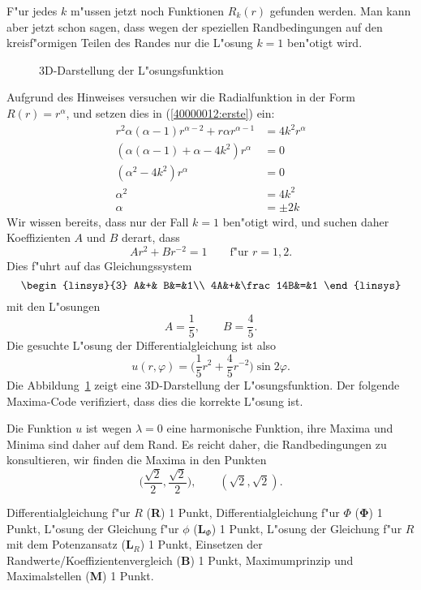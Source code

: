 \begin{loesung}
\begin{teilaufgaben}
F"ur jedes $k$ m"ussen jetzt noch Funktionen $R_k(r)$ gefunden werden.
Man kann aber jetzt schon sagen, dass wegen der speziellen Randbedingungen
auf den kreisf"ormigen Teilen des Randes nur die L"osung $k=1$ ben"otigt wird.

\begin{figure}
\centering
{}
\caption{3D-Darstellung der L"osungsfunktion
\label{40000012:3d}}
\end{figure}
Aufgrund des Hinweises versuchen wir die Radialfunktion in der Form
$R(r)=r^\alpha$, und setzen dies in (\ref{40000012:erste}) ein:
\begin{align*}
r^2\alpha(\alpha-1)r^{\alpha-2}+r\alpha r^{\alpha-1}&=4k^2r^{\alpha}
\\
(\alpha(\alpha-1)+\alpha -4k^2)r^{\alpha}&=0
\\
(\alpha^2 -4k^2)r^{\alpha}&=0
\\
\alpha^2&=4k^2
\\
\alpha&=\pm2k
\end{align*}
Wir wissen bereits, dass nur der Fall $k=1$ ben"otigt wird, und suchen
daher Koeffizienten $A$ und $B$ derart, dass
\[
Ar^2+Br^{-2}=1\qquad \text{f"ur $r=1,2$.}
\]
Dies f"uhrt auf das Gleichungssystem
\[
\begin{linsys}{3}
 A&+&       B&=&1\\
4A&+&\frac14B&=&1
\end{linsys}
\]
mit den L"osungen
\[
A=\frac15,\qquad B=\frac45.
\]
Die gesuchte L"osung der Differentialgleichung ist also
\[
u(r,\varphi)=\biggl(\frac15r^2+\frac45r^{-2}\biggr)\sin 2\varphi.
\]
Die Abbildung~\ref{40000012:3d} zeigt eine 3D-Darstellung der L"osungsfunktion.
Der folgende Maxima-Code verifiziert, dass dies die korrekte L"osung ist.
\item
Die Funktion $u$ ist wegen $\lambda=0$ eine harmonische Funktion, ihre
Maxima und Minima sind daher auf dem Rand.
Es reicht daher, die Randbedingungen zu konsultieren, wir finden die
Maxima in den Punkten
\[
\biggl(\frac{\sqrt{2}}{2},\frac{\sqrt{2}}2\biggr),\qquad
(\sqrt{2},\sqrt{2}).
\]
\end{teilaufgaben}
\end{loesung}

\begin{bewertung}
Differentialgleichung f"ur $R$ ({\bf R}) 1 Punkt,
Differentialgleichung f"ur $\Phi$ ({$\mathbf \Phi$}) 1 Punkt,
L"osung der Gleichung f"ur $\phi$ ($\textbf{L}_\Phi$) 1 Punkt,
L"osung der Gleichung f"ur $R$ mit dem Potenzansatz ($\textbf{L}_R$) 1 Punkt,
Einsetzen der Randwerte/Koeffizientenvergleich ({\bf B}) 1 Punkt,
Maximumprinzip und Maximalstellen ({\bf M}) 1 Punkt.
\end{bewertung}


